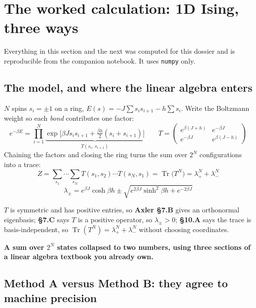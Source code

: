 \clearpage
\renewcommand{\sectioncolor}{ember}
\section{The worked calculation: 1D Ising, three ways}

\noindent Everything in this section and the next was computed for this dossier and is reproducible
from the companion notebook. It uses \texttt{numpy} only.

\subsection{The model, and where the linear algebra enters}

$N$ spins $s_i=\pm1$ on a ring, $E(s)=-J\sum s_i s_{i+1}-h\sum s_i$. Write the Boltzmann weight so
each \emph{bond} contributes one factor:
\[
e^{-\beta E}=\prod_{i=1}^{N}\underbrace{\exp\!\Big[\beta J s_i s_{i+1}+\tfrac{\beta h}{2}(s_i+s_{i+1})\Big]}_{\textstyle T(s_i,\,s_{i+1})}
\qquad
T=\begin{pmatrix} e^{\beta(J+h)} & e^{-\beta J}\\[2pt] e^{-\beta J} & e^{\beta(J-h)}\end{pmatrix}
\]
Chaining the factors and closing the ring turns the sum over $2^N$ configurations into a trace:
\[
\boxed{\;Z=\sum_{s_1}\cdots\sum_{s_N}T(s_1,s_2)\cdots T(s_N,s_1)=\operatorname{Tr}\big(T^N\big)=\lambda_+^N+\lambda_-^N\;}
\]
\[
\lambda_\pm=e^{\beta J}\cosh\beta h\pm\sqrt{e^{2\beta J}\sinh^2\!\beta h+e^{-2\beta J}}
\]

\begin{keyidea}[title={Notice exactly which theorems did the work}]
$T$ is symmetric and has positive entries, so \textbf{Axler §7.B} gives an orthonormal eigenbasis;
\textbf{§7.C} says $T$ is a positive operator, so $\lambda_\pm>0$; \textbf{§10.A} says the trace is
basis-independent, so $\operatorname{Tr}(T^N)=\lambda_+^N+\lambda_-^N$ without choosing coordinates.

\textbf{A sum over $2^N$ states collapsed to two numbers, using three sections of a linear algebra
textbook you already own.}
\end{keyidea}

\subsection{Method A versus Method B: they agree to machine precision}

